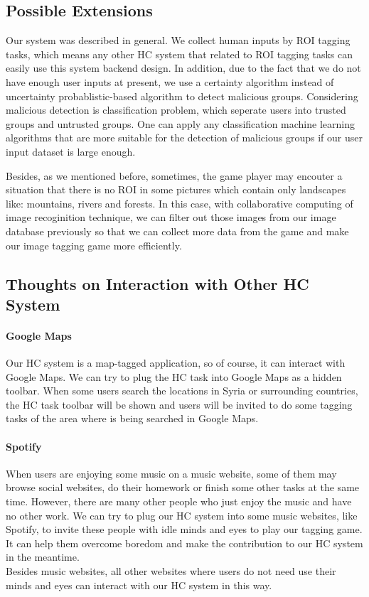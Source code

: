 \subsection{Possible Extensions}

Our system was described in general. We collect human inputs by ROI tagging tasks, 
which means any other HC system that related to ROI tagging tasks can easily use this system backend design.
In addition, due to the fact that we do not have enough user inputs at present, we use a certainty algorithm instead of 
uncertainty probablistic-based algorithm to detect malicious groups. 
Considering malicious detection is classification problem, which seperate users into trusted groups and untrusted groups. 
One can apply any classification machine learning algorithms that are more suitable for the detection of malicious groups 
if our user input dataset is large enough.

Besides, as we mentioned before, sometimes, the game player may encouter a situation that 
there is no ROI in some pictures which contain only landscapes like: mountains, rivers and forests.
In this case, with collaborative computing of image recoginition technique, we can filter out those images 
from our image database previously so that we can collect more data from the game and 
make our image tagging game more efficiently.

\subsection{Thoughts on Interaction with Other HC System}

\paragraph{Google Maps}
Our HC system is a map-tagged application, so of course, it can interact with Google Maps. 
We can try to plug the HC task into Google Maps as a hidden toolbar. When some users search the locations in Syria 
or surrounding countries, the HC task toolbar will be shown and users will be invited to do some tagging tasks 
of the area where is being searched in Google Maps.

\paragraph{Spotify}
When users are enjoying some music on a music website, some of them may browse social websites, 
do their homework or finish some other tasks at the same time. However, there are many other people 
who just enjoy the music and have no other work. We can try to plug our HC system into some music websites, 
like Spotify, to invite these people with idle minds and eyes to play our tagging game. 
It can help them overcome boredom and make the contribution to our HC system in the meantime.\\
Besides music websites, all other websites where users do not need use their minds and eyes 
can interact with our HC system in this way.


